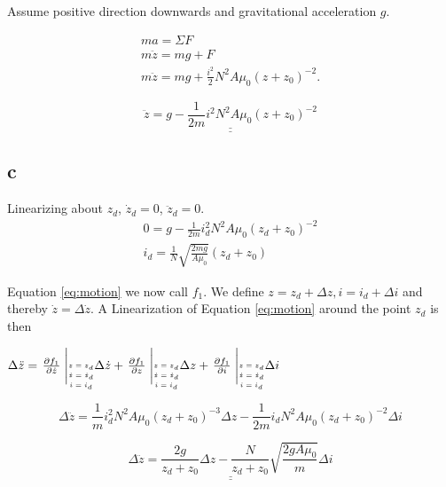 \documentclass{article}
\begin{document}
Assume positive direction downwards and gravitational acceleration $g$.

\begin{align*}
	ma = \Sigma F\\
	m\ddot z = mg + F\\
	m\ddot z = mg + \frac{i^2}{2}N^2A\mu_0(z + z_0)^{-2}.
\end{align*}

\begin{equation}\label{eq:motion}
	\underline{\underline{\ddot z = g - \frac{1}{2m}i^2N^2A\mu_0(z+z_0)^{-2}}}
\end{equation}


\subsection{c}
Linearizing about $z_d$, $\dot z_d = 0$, $\ddot z_d = 0$.
\begin{align*}
	0 = g - \frac{1}{2m}i_d^2N^2A\mu_0(z_d+z_0)^{-2}\\
	i_d = \frac{1}{N}\sqrt{\frac{2mg}{A\mu_0}}(z_d + z_0)
\end{align*}

Equation \ref{eq:motion} we now call $f_1$. We define $z = z_d + \Delta z, i = i_d + \Delta i$ and thereby $\dot z = \Delta\dot z$. A Linearization of Equation \ref{eq:motion} around the point $z_d$ is then


	$\Delta\ddot z = \left. \frac{\partial f_1}{\partial \dot z} \right.\Bigg|_{\shortstack{\tiny $z = z_d$ \\ \tiny $\dot z = \dot z_d$ \\ \tiny $i = i_d$}} \Delta \dot z + \left. \frac{\partial f_1}{\partial z} \right.\Bigg|_{\shortstack{\tiny $z = z_d$ \\ \tiny $\dot z = \dot z_d$ \\ \tiny $i = i_d$}} \Delta z + \left. \frac{\partial f_1}{\partial i} \right.\Bigg|_{\shortstack{\tiny $z = z_d$ \\ \tiny $\dot z = \dot z_d$ \\ \tiny $i = i_d$}} \Delta i\\$

\begin{equation*}
	\Delta\ddot z = \frac{1}{m}i_d^2N^2A\mu_0(z_d+z_0)^{-3} \Delta z - \frac{1}{2m}i_dN^2A\mu_0(z_d+z_0)^{-2}\Delta i
\end{equation*}


\begin{equation*}
	\underline{\underline{\Delta \ddot z = \frac{2g}{z_d + z_0} \Delta z - \frac{N}{z_d + z_0}\sqrt{\frac{2gA\mu_0}{m}} \Delta i}}
\end{equation*}
\end{document}
